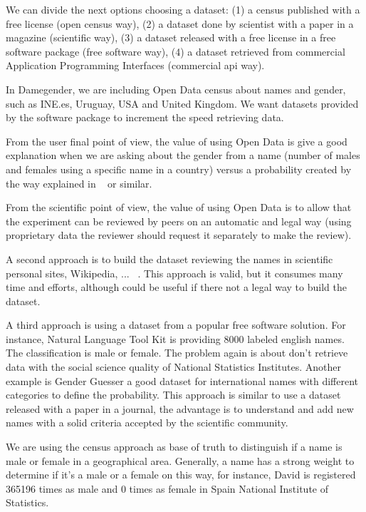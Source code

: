 \documentclass[a4paper]{article}
\begin{document}
We can divide the next options choosing a dataset: (1) a census
published with a free license (open census way), (2) a dataset done by
scientist with a paper in a magazine (scientific way), (3) a dataset
released with a free license in a free software package (free software
way), (4) a dataset retrieved from commercial Application Programming
Interfaces (commercial api way).

In Damegender, we are including Open Data census about names and
gender, such as INE.es, Uruguay, USA and United Kingdom. We want
datasets provided by the software package to increment the speed
retrieving data.

From the user final point of view, the value of using Open Data is
give a good explanation when we are asking about the gender from a
name (number of males and females using a specific name in a country)
versus a probability created by the way explained in
~\cite{10.7717/peerj-cs.156} or similar.

From the scientific point of view, the value of using Open Data is to
allow that the experiment can be reviewed by peers on an automatic and
legal way (using proprietary data the reviewer should request it
separately to make the review).

A second approach is to build the dataset reviewing the names in
scientific personal sites, Wikipedia,
... ~\cite{10.7717/peerj-cs.156}. This approach is valid, but it
consumes many time and efforts, although could be useful if there not
a legal way to build the dataset.

A third approach is using a dataset from a popular free software
solution. For instance, Natural Language Tool Kit is providing 8000
labeled english names. The classification is male or female. The
problem again is about don't retrieve data with the social science
quality of National Statistics Institutes. Another example is Gender
Guesser a good dataset for international names with different
categories to define the probability. This approach is similar to use
a dataset released with a paper in a journal, the advantage is to
understand and add new names with a solid criteria accepted by the
scientific community.

We are using the census approach as base of truth to distinguish if a
name is male or female in a geographical area. Generally, a name has a
strong weight to determine if it's a male or a female on this way, for
instance, David is registered 365196 times as male and 0 times as
female in Spain National Institute of Statistics.
\end{document}
